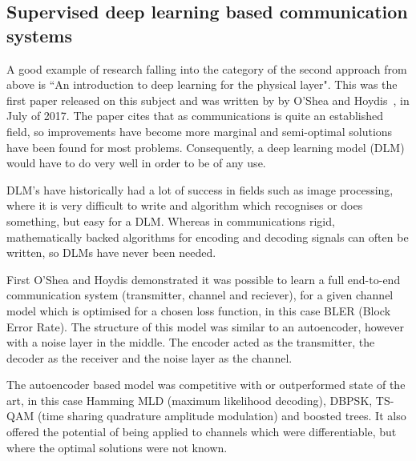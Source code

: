 \documentclass[12pt,onecolumn,letterpaper]{article}
\begin{document}
\subsection{Supervised deep learning based communication systems}

A good example of research falling into the category of the second approach from above is ``An introduction to deep learning for the physical layer". This was the first paper released on this subject and was written by by O'Shea and Hoydis~\cite{oShea}, in July of 2017. The paper cites that as communications is quite an established field, so improvements have become more marginal and semi-optimal solutions have been found for most problems. Consequently, a deep learning model (DLM) would have to do very well in order to be of any use. 

DLM’s have historically had a lot of success in fields such as image processing, where it is very difficult to write and algorithm which recognises or does something, but easy for a DLM. Whereas in communications rigid, mathematically backed algorithms for encoding and decoding signals can often be written, so DLMs have never been needed.

First O'Shea and Hoydis demonstrated it was possible to learn a full end-to-end communication system (transmitter, channel and reciever), for a given channel model which is optimised for a chosen loss function, in this case BLER (Block Error Rate). The structure of this model was similar to an autoencoder, however with a noise layer in the middle. The encoder acted as the transmitter, the decoder as the receiver and the noise layer as the channel.

The autoencoder based model was competitive with or outperformed state of the art, in this case Hamming MLD (maximum likelihood decoding), DBPSK, TS-QAM (time sharing quadrature amplitude modulation) and boosted trees. It also offered the potential of being applied to channels which were differentiable, but where the optimal solutions were not known. 
\end{document}
